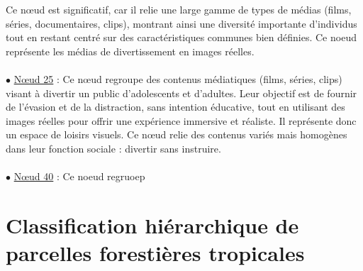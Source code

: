 \documentclass{article}
\begin{document}
Ce nœud est significatif, car il relie une large gamme de types de médias (films, séries, documentaires, clips), montrant ainsi une diversité importante d'individus tout en restant centré sur des caractéristiques communes bien définies. Ce noeud représente les médias de divertissement en images réelles.
\\\\
\noindent $\bullet$ \underline{Nœud 25} : Ce nœud regroupe des contenus médiatiques (films, séries, clips) visant à divertir un public d'adolescents et d'adultes. Leur objectif est de fournir de l’évasion et de la distraction, sans intention éducative, tout en utilisant des images réelles pour offrir une expérience immersive et réaliste.
Il représente donc un espace de loisirs visuels. Ce nœud relie des contenus variés mais homogènes dans leur fonction sociale : divertir sans instruire.
\\\\
\noindent $\bullet$ \underline{Nœud 40} : Ce noeud regruoep

\section{Classification hiérarchique de parcelles forestières tropicales}
\end{document}
